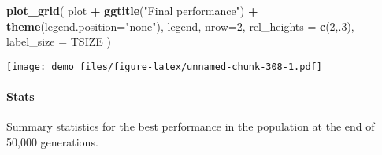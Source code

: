 \documentclass[]{book}
\newenvironment{Shaded}{\begin{snugshade}}{\end{snugshade}}
\newcommand{\DataTypeTok}[1]{\textcolor[rgb]{0.13,0.29,0.53}{#1}}
\newcommand{\DecValTok}[1]{\textcolor[rgb]{0.00,0.00,0.81}{#1}}
\newcommand{\KeywordTok}[1]{\textcolor[rgb]{0.13,0.29,0.53}{\textbf{#1}}}
\newcommand{\NormalTok}[1]{#1}
\newcommand{\OperatorTok}[1]{\textcolor[rgb]{0.81,0.36,0.00}{\textbf{#1}}}
\newcommand{\OtherTok}[1]{\textcolor[rgb]{0.56,0.35,0.01}{#1}}
\newcommand{\StringTok}[1]{\textcolor[rgb]{0.31,0.60,0.02}{#1}}
\let\oldparagraph\paragraph
\renewcommand{\paragraph}[1]{\oldparagraph{#1}\mbox{}}
\begin{document}
\begin{Shaded}
\begin{Highlighting}[]
\KeywordTok{plot_grid}\NormalTok{(}
\NormalTok{  plot }\OperatorTok{+}
\StringTok{    }\KeywordTok{ggtitle}\NormalTok{(}\StringTok{"Final performance"}\NormalTok{) }\OperatorTok{+}
\StringTok{    }\KeywordTok{theme}\NormalTok{(}\DataTypeTok{legend.position=}\StringTok{"none"}\NormalTok{),}
\NormalTok{  legend,}
  \DataTypeTok{nrow=}\DecValTok{2}\NormalTok{,}
  \DataTypeTok{rel_heights =} \KeywordTok{c}\NormalTok{(}\DecValTok{2}\NormalTok{,.}\DecValTok{3}\NormalTok{),}
  \DataTypeTok{label_size =}\NormalTok{ TSIZE}
\NormalTok{)}
\end{Highlighting}
\end{Shaded}

\texttt{[image: demo\_files/figure-latex/unnamed-chunk-308-1.pdf]}

\hypertarget{stats-59}{%
\paragraph{Stats}\label{stats-59}}

Summary statistics for the best performance in the population at the end of 50,000 generations.

\begin{Shaded}
\end{Shaded}
\end{document}
